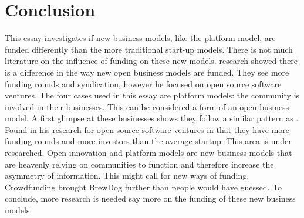 \documentclass[a4paper, 11pt]{article}
\begin{document}
\section{Conclusion}
This essay investigates if new business models, like the platform model, are funded differently than the more traditional start-up models. There is not much literature on the influence of funding on these new models. \cite{colombo2016open} research showed there is a difference in the way new open business models are funded. They see more funding rounds and syndication, however he focused on open source software ventures. The four cases used in this essay are platform models: the community is involved in their businesses. This can be considered a form of an open business model. A first glimpse at these businesses shows they follow a similar pattern as \cite{colombo2016open}. Found in his research for open source software ventures in that they have more funding rounds and more investors than the average startup.  
This area is under researched. Open innovation and platform models are new business models that are heavenly relying on communities to function and therefore increase the asymmetry of information. This might call for new ways of funding. Crowdfunding brought BrewDog further than people would have guessed. To conclude, more research is needed say more on the funding of these new business models.

\renewcommand{\textbf}{}
\renewcommand{\bf}{}
{}
\end{document}
